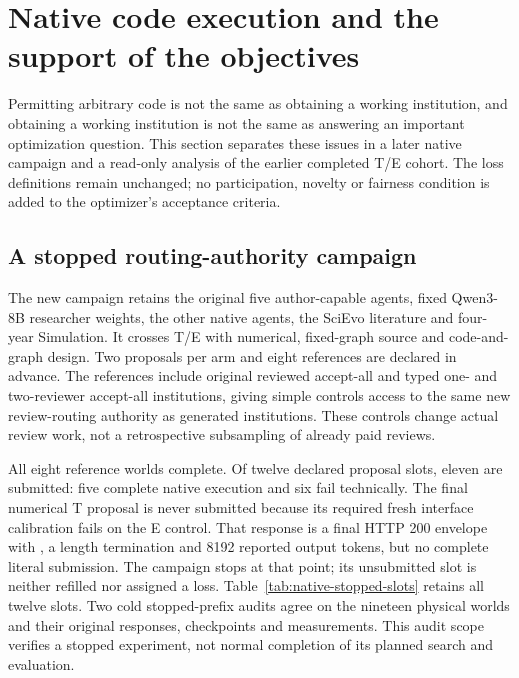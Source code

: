 \section{Native code execution and the support of the objectives}
\label{sec:native-loop}
Permitting arbitrary code is not the same as obtaining a working institution,
and obtaining a working institution is not the same as answering an important
optimization question. This section separates these issues in a later native
campaign and a read-only analysis of the earlier completed T/E cohort.
The loss definitions remain unchanged; no participation, novelty or fairness
condition is added to the optimizer's acceptance criteria.

\subsection{A stopped routing-authority campaign}
The new campaign retains the original five author-capable agents, fixed
Qwen3-8B researcher weights, the other native agents, the
SciEvo literature and four-year Simulation. It crosses T/E with numerical,
fixed-graph source and code-and-graph design. Two proposals per arm and eight
references are declared in advance. The references include original reviewed
accept-all and typed one- and two-reviewer accept-all institutions, giving
simple controls access to the same new review-routing authority as generated
institutions. These controls change actual review work, not a retrospective
subsampling of already paid reviews.

All eight reference worlds complete. Of twelve declared proposal slots,
eleven are submitted: five complete native execution and six fail technically.
The final numerical T proposal is never submitted because its required fresh
interface calibration fails on the E control. That response is a final HTTP 200
envelope with , a length termination and 8192 reported output
tokens, but no complete literal submission. The campaign stops at that point;
its unsubmitted slot is neither refilled nor assigned a loss.
Table~\ref{tab:native-stopped-slots} retains all twelve slots. Two cold
stopped-prefix audits agree on the nineteen physical worlds and their original
responses, checkpoints and measurements. This audit scope verifies a stopped
experiment, not normal completion of its planned search and evaluation.

